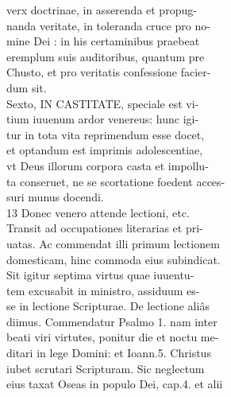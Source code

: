 \documentclass{article}
\begin{document}
\begin{pages}
                verx doctrinae, in asserenda et propug- \\
                nanda veritate, in toleranda cruce pro no- \\
                mine Dei : in his certaminibus praebeat \\
                eremplum suis auditoribus, quantum pre \\
                Chusto, et pro veritatis confessione facier- \\
                dum sit. \\
                Sexto, IN CASTITATE, speciale est vi- \\
                tium iuuenum ardor venereus: hunc igi- \\
                tur in tota vita reprimendum esse docet, \\
                et optandum est imprimis adolescentiae, \\
                vt Deus illorum corpora casta et impollu- \\
                ta conseruet, ne se scortatione foedent acces- \\
                suri munus docendi. \\
                13 Donec venero attende lectioni, etc. \\
                Transit ad occupationes literarias et pri- \\
                uatas. Ac commendat illi primum lectionem \\
                domesticam, hinc commoda eius subindicat. \\
                Sit igitur septima virtus quae iuuentu- \\
                tem excusabit in ministro, assiduum es- \\
                se in lectione Scripturae. De lectione aliâs \\
                diimus. Commendatur Psalmo 1. nam inter \\
                beati viri virtutes, ponitur die et noctu me- \\
                ditari in lege Domini: et Ioann.5. Christus \\
                iubet scrutari Scripturam. Sic neglectum \\
                eius taxat Oseas in populo Dei, cap.4. et alii \\

\end{pages}
\end{document}
